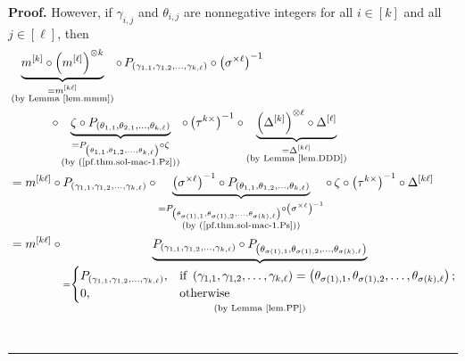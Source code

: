 \documentclass[numbers=enddot,12pt,final,onecolumn,notitlepage]{scrartcl}%
\theoremstyle{definition}
\newenvironment{proof}[1][Proof]{\noindent\textbf{#1.} }{\ \rule{0.5em}{0.5em}}
\begin{document}
\begin{proof}
However, if $\gamma_{i,j}$ and $\theta_{i,j}$ are nonnegative integers for all
$i\in\left[  k\right]  $ and all $j\in\left[  \ell\right]  $, then%
\begin{align*}
&  \underbrace{m^{\left[  k\right]  }\circ\left(  m^{\left[  \ell\right]
}\right)  ^{\otimes k}}_{\substack{=m^{\left[  k\ell\right]  }\\\text{(by
Lemma \ref{lem.mmm})}}}\circ\,P_{\left(  \gamma_{1,1},\gamma_{1,2}%
,\ldots,\gamma_{k,\ell}\right)  }\circ\left(  \sigma^{\times\ell}\right)
^{-1}\\
&  \ \ \ \ \ \ \ \ \ \ \circ\underbrace{\zeta\circ P_{\left(  \theta
_{1,1},\theta_{2,1},\ldots,\theta_{k,\ell}\right)  }}_{\substack{=P_{\left(
\theta_{1,1},\theta_{1,2},\ldots,\theta_{k,\ell}\right)  }\circ\zeta
\\\text{(by (\ref{pf.thm.sol-mac-1.Pz}))}}}\circ\left(  \tau^{k\times}\right)
^{-1}\circ\underbrace{\left(  \Delta^{\left[  k\right]  }\right)
^{\otimes\ell}\circ\Delta^{\left[  \ell\right]  }}_{\substack{=\Delta^{\left[
k\ell\right]  }\\\text{(by Lemma \ref{lem.DDD})}}}\\
&  =m^{\left[  k\ell\right]  }\circ P_{\left(  \gamma_{1,1},\gamma
_{1,2},\ldots,\gamma_{k,\ell}\right)  }\circ\underbrace{\left(  \sigma
^{\times\ell}\right)  ^{-1}\circ P_{\left(  \theta_{1,1},\theta_{1,2}%
,\ldots,\theta_{k,\ell}\right)  }}_{\substack{=P_{\left(  \theta
_{\sigma\left(  1\right)  ,1},\theta_{\sigma\left(  1\right)  ,2}%
,\ldots,\theta_{\sigma\left(  k\right)  ,\ell}\right)  }\circ\left(
\sigma^{\times\ell}\right)  ^{-1}\\\text{(by (\ref{pf.thm.sol-mac-1.Ps}))}%
}}\circ\,\zeta\circ\left(  \tau^{k\times}\right)  ^{-1}\circ\Delta^{\left[
k\ell\right]  }\\
&  =m^{\left[  k\ell\right]  }\circ\underbrace{P_{\left(  \gamma_{1,1}%
,\gamma_{1,2},\ldots,\gamma_{k,\ell}\right)  }\circ P_{\left(  \theta
_{\sigma\left(  1\right)  ,1},\theta_{\sigma\left(  1\right)  ,2}%
,\ldots,\theta_{\sigma\left(  k\right)  ,\ell}\right)  }}_{\substack{=%
\begin{cases}
P_{\left(  \gamma_{1,1},\gamma_{1,2},\ldots,\gamma_{k,\ell}\right)  }, &
\text{if }\left(  \gamma_{1,1},\gamma_{1,2},\ldots,\gamma_{k,\ell}\right)
=\left(  \theta_{\sigma\left(  1\right)  ,1},\theta_{\sigma\left(  1\right)
,2},\ldots,\theta_{\sigma\left(  k\right)  ,\ell}\right)  ;\\
0, & \text{otherwise}%
\end{cases}
\\\text{(by Lemma \ref{lem.PP})}}}\\

\end{align*}
\end{proof}
\end{document}
